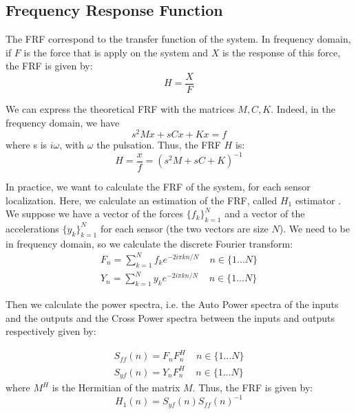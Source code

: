 \documentclass[journal]{IEEEtran}
\begin{document}
\subsection{Frequency Response Function}

The FRF correspond to the transfer function of the system. In frequency domain, if $F$ is the force that is apply on the system and $X$ is the response of this force, the FRF is given by:
\begin{equation}
H = \frac{X}{F}
\end{equation} 

We can express the theoretical FRF with the matrices $M, C, K$. Indeed, in the frequency domain, we have
\begin{equation}
s^2 M x + s C x + K x = f
\end{equation}
where s is $i\omega$, with $\omega$ the pulsation.
Thus, the FRF $H$ is:
\begin{equation}
H = \frac{x}{f} = (s^2 M + s C + K)^{-1}
\end{equation}


In practice, we want to calculate the FRF of the system, for each sensor localization. Here, we calculate an estimation of the FRF, called $H_1$ estimator \cite{cauberghe2004applied}. We suppose we have a vector of the forces $\{ f_k\}_{k=1}^N$ and a vector of the accelerations $\{ y_k\}_{k=1}^N$ for each sensor (the two vectors are size $N$). We need to be in frequency domain, so we calculate the discrete Fourier transform:
\begin{equation}
\begin{array}{ll}
F_n = \sum\limits_{k=1}^N f_k e^{-2i\pi kn/N} \ \ \ \ \ n \in \{1 ... N\} \\
Y_n = \sum\limits_{k=1}^N y_k e^{-2i\pi kn/N} \ \ \ \ \ n \in \{1 ... N\}
\end{array}
\end{equation}

Then we calculate the power spectra, i.e. the Auto Power spectra of the inputs and the outputs
and the Cross Power spectra between the inputs and outputs respectively given by:

\begin{equation}
\begin{array}{ll}
S_{ff}(n) = F_n F_n^H \ \ \ \ \ n \in \{1 ... N\} \\
S_{yf}(n) = Y_n F_n^H \ \ \ \ \ n \in \{1 ... N\}
\end{array}
\end{equation}
where $M^H$ is the Hermitian of the matrix $M$. Thus, the FRF is given by:
\begin{equation}
H_1(n) = S_{yf}(n) S_{ff}(n)^{-1}
\end{equation}
\end{document}
